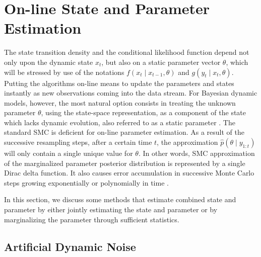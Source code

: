 \section{On-line State and Parameter Estimation}\label{sectionStateandPara}

The state transition density and the conditional likelihood function depend not only upon the dynamic state $x_t$, but also on a static parameter vector $\theta$, which will be stressed by use of the notations $f(x_t \mid x_{t-1},\theta)$ and $g(y_t\mid x_t,\theta)$. Putting the algorithms on-line means to update the parameters and states instantly as new observations coming into the data stream. For Bayesian dynamic models, however, the most natural option consists in treating the unknown parameter $\theta$, using the state-space representation, as a component of the state which lacks dynamic evolution, also referred to as a static parameter \citep{cappe2007overview}. The standard SMC is deficient for on-line parameter estimation. As a result of the successive resampling steps, after a certain time $t$, the approximation $\hat{p}(\theta\mid y_{1:t})$ will only contain a single unique value for $\theta$. In other words, SMC approximation of the marginalized parameter posterior distribution is represented by a single Dirac delta function. It also causes error accumulation in successive Monte Carlo steps growing exponentially or polynomially in time \citep{kantas2009overview}. 

In this section, we discuss some methods that estimate combined state and parameter by either jointly estimating the state and parameter or by marginalizing the parameter through sufficient statistics. 





\subsection{Artificial Dynamic Noise}\label{ArtificialNoise}

